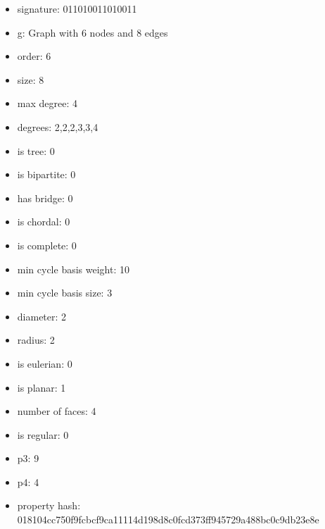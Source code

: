 \begin{itemize}
\item signature: 011010011010011
\item g: Graph with 6 nodes and 8 edges
\item order: 6
\item size: 8
\item max degree: 4
\item degrees: 2,2,2,3,3,4
\item is tree: 0
\item is bipartite: 0
\item has bridge: 0
\item is chordal: 0
\item is complete: 0
\item min cycle basis weight: 10
\item min cycle basis size: 3
\item diameter: 2
\item radius: 2
\item is eulerian: 0
\item is planar: 1
\item number of faces: 4
\item is regular: 0
\item p3: 9
\item p4: 4
\item property hash: 018104cc750f9fcbcf9ca11114d198d8c0fcd373ff945729a488bc0c9db23e8e
\end{itemize}
\newpage
